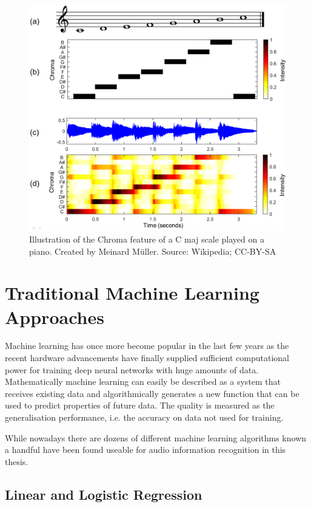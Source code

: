 \begin{figure}[p]
    \centering
	\includegraphics[width=.85\textwidth]{./images/illustrations/chroma}
    \caption{Illustration of the Chroma feature of a C maj scale played on a piano. Created by Meinard Müller. Source: Wikipedia; CC-BY-SA}
    \label{fig:chroma}
\end{figure}



\section{Traditional Machine Learning Approaches}


Machine learning has once more become popular in the last few years as the recent hardware advancements have finally supplied sufficient computational power for training deep neural networks with huge amounts of data.
Mathematically machine learning can easily be described as a system that receives existing data and algorithmically generates a new function that can be used to predict properties of future data.
The quality is measured as the generalisation performance, i.e. the accuracy on data not used for training.

While nowadays there are dozens of different machine learning algorithms known a handful have been found useable for audio information recognition in this thesis.


\subsection{Linear and Logistic Regression}
\label{chptr:reg}

